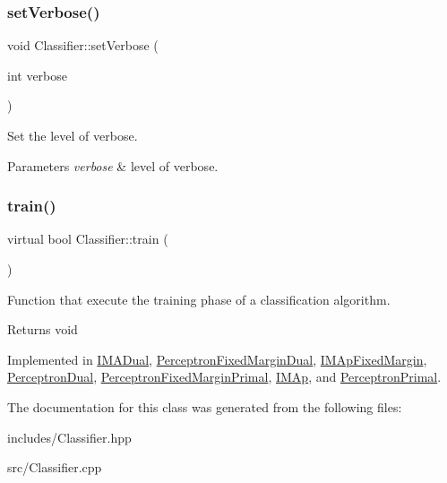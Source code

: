 \subsubsection{\texorpdfstring{set\+Verbose()}{setVerbose()}}
{\footnotesize\ttfamily void Classifier\+::set\+Verbose (\begin{DoxyParamCaption}\item[{int}]{verbose }\end{DoxyParamCaption})}



Set the level of verbose. 


\begin{DoxyParams}{Parameters}
{\em verbose} & level of verbose. \\
\hline
\end{DoxyParams}
\mbox{\label{class_classifier_a2306a5de27555ab093593ac9642bc7d9}} 
\subsubsection{\texorpdfstring{train()}{train()}}
{\footnotesize\ttfamily virtual bool Classifier\+::train (\begin{DoxyParamCaption}{ }\end{DoxyParamCaption})\hspace{0.3cm}{\ttfamily [pure virtual]}}



Function that execute the training phase of a classification algorithm. 

\begin{DoxyReturn}{Returns}
void 
\end{DoxyReturn}


Implemented in \hyperlink{class_i_m_a_dual_aad4b4f97645da661c954259e52c424b4}{I\+M\+A\+Dual}, \hyperlink{class_perceptron_fixed_margin_dual_a0925463956b40a5999e91e60e3e0bf1f}{Perceptron\+Fixed\+Margin\+Dual}, \hyperlink{class_i_m_ap_fixed_margin_a79fd9791d7c0998706f280d446ece5ee}{I\+M\+Ap\+Fixed\+Margin}, \hyperlink{class_perceptron_dual_a67acd9361cba43bbe2d682c4acd4ecaf}{Perceptron\+Dual}, \hyperlink{class_perceptron_fixed_margin_primal_ad013cf0293dd8cda3ac751216b5a7f89}{Perceptron\+Fixed\+Margin\+Primal}, \hyperlink{class_i_m_ap_a0d9fc6d772e27882ce77902c44a91ddb}{I\+M\+Ap}, and \hyperlink{class_perceptron_primal_aea1195af5503b2dfb086aacc92acfdc9}{Perceptron\+Primal}.



The documentation for this class was generated from the following files\+:\begin{DoxyCompactItemize}
\item 
includes/Classifier.\+hpp\item 
src/Classifier.\+cpp\end{DoxyCompactItemize}
